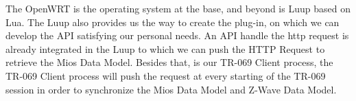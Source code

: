 The OpenWRT is the operating system at the base, and beyond is Luup based on Lua. The Luup also provides us the way to create the plug-in, on which we can develop the API satisfying our personal needs. An API handle the http request is already integrated in the Luup to which we can push the HTTP Request to retrieve the Mios Data Model. Besides that, is our TR-069 Client process, the TR-069 Client process will push the request at every starting of the TR-069 session in order to synchronize the Mios Data Model and Z-Wave Data Model.

